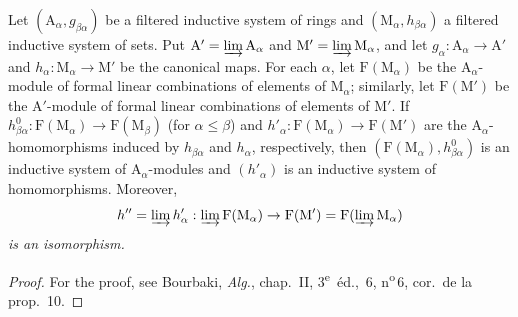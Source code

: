 \begin{lemma}[11.2.2.2]
\label{IV.11.2.2.2}
Let $(\mathrm{A}_\alpha,g_{\beta\alpha})$ be a filtered inductive system
of rings and $(\mathrm{M}_\alpha,h_{\beta\alpha})$ a filtered inductive
system of sets. Put
$\mathrm{A}'=\varinjlim\mathrm{A}_\alpha$ and
$\mathrm{M}'=\varinjlim\mathrm{M}_\alpha$, and let
$g_\alpha:\mathrm{A}_\alpha\to\mathrm{A}'$ and
$h_\alpha:\mathrm{M}_\alpha\to\mathrm{M}'$ be the canonical maps. For
each $\alpha$, let $\mathrm{F}(\mathrm{M}_\alpha)$ be the
$\mathrm{A}_\alpha$-module of formal linear combinations of elements of
$\mathrm{M}_\alpha$; similarly, let $\mathrm{F}(\mathrm{M}')$ be the
$\mathrm{A}'$-module of formal linear combinations of elements of
$\mathrm{M}'$. If
$h_{\beta\alpha}^0:\mathrm{F}(\mathrm{M}_\alpha)\to
\mathrm{F}(\mathrm{M}_\beta)$ (for $\alpha\leqslant\beta$) and
$h'_\alpha:\mathrm{F}(\mathrm{M}_\alpha)\to\mathrm{F}(\mathrm{M}')$
are the $\mathrm{A}_\alpha$-homomorphisms induced by
$h_{\beta\alpha}$ and $h_\alpha$, respectively, then
$(\mathrm{F}(\mathrm{M}_\alpha),h^0_{\beta\alpha})$ is an inductive
system of $\mathrm{A}_\alpha$-modules and $(h'_\alpha)$ is an inductive
system of homomorphisms. Moreover,
\[
  h''=\varinjlim h'_\alpha:\varinjlim\mathrm{F}(\mathrm{M}_\alpha)\to\mathrm{F}(\mathrm{M}')=\mathrm{F}(\varinjlim\mathrm{M}_\alpha)
\]
\emph{is an isomorphism.}
\end{lemma}

\begin{proof}
For the proof, see Bourbaki, \emph{Alg.}, chap.~II, 3\textsuperscript{e}~\'{e}d., \textsection\,6, n\textsuperscript{o}\,6, cor.\ de la prop.~10.
\end{proof}

